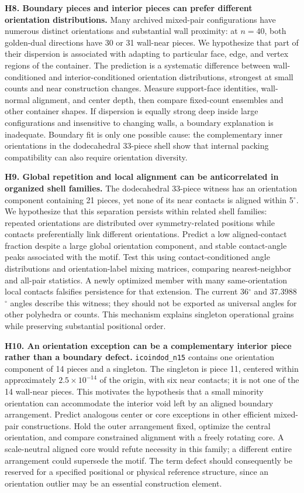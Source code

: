 \documentclass[11pt,a4paper]{article}
\begin{document}
\textbf{H8. Boundary pieces and interior pieces can prefer different orientation distributions.} Many archived mixed-pair configurations have numerous distinct orientations and substantial wall proximity: at $n=40$, both golden-dual directions have 30 or 31 wall-near pieces. We hypothesize that part of their dispersion is associated with adapting to particular face, edge, and vertex regions of the container. The prediction is a systematic difference between wall-conditioned and interior-conditioned orientation distributions, strongest at small counts and near construction changes. Measure support-face identities, wall-normal alignment, and center depth, then compare fixed-count ensembles and other container shapes. If dispersion is equally strong deep inside large configurations and insensitive to changing walls, a boundary explanation is inadequate. Boundary fit is only one possible cause: the complementary inner orientations in the dodecahedral 33-piece shell show that internal packing compatibility can also require orientation diversity.

\textbf{H9. Global repetition and local alignment can be anticorrelated in organized shell families.} The dodecahedral 33-piece witness has an orientation component containing 21 pieces, yet none of its near contacts is aligned within 5$^{\circ}$. We hypothesize that this separation persists within related shell families: repeated orientations are distributed over symmetry-related positions while contacts preferentially link different orientations. Predict a low aligned-contact fraction despite a large global orientation component, and stable contact-angle peaks associated with the motif. Test this using contact-conditioned angle distributions and orientation-label mixing matrices, comparing nearest-neighbor and all-pair statistics. A newly optimized member with many same-orientation local contacts falsifies persistence for that extension. The current 36$^{\circ}$ and 37.3988$^{\circ}$ angles describe this witness; they should not be exported as universal angles for other polyhedra or counts. This mechanism explains singleton operational grains while preserving substantial positional order.

\textbf{H10. An orientation exception can be a complementary interior piece rather than a boundary defect.} \nolinkurl{icoindod_n15} contains one orientation component of 14 pieces and a singleton. The singleton is piece 11, centered within approximately $2.5\times10^{-14}$ of the origin, with six near contacts; it is not one of the 14 wall-near pieces. This motivates the hypothesis that a small minority orientation can accommodate the interior void left by an aligned boundary arrangement. Predict analogous center or core exceptions in other efficient mixed-pair constructions. Hold the outer arrangement fixed, optimize the central orientation, and compare constrained alignment with a freely rotating core. A scale-neutral aligned core would refute necessity in this family; a different entire arrangement could supersede the motif. The term defect should consequently be reserved for a specified positional or physical reference structure, since an orientation outlier may be an essential construction element.
\end{document}
